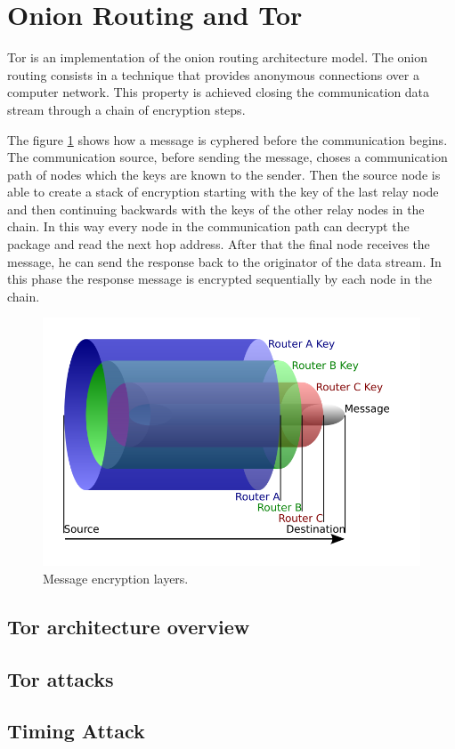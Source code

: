 \section{Onion Routing and Tor}
\label{sec:tor}
Tor is an implementation of the onion routing architecture model. The
onion routing consists in a technique that provides anonymous
connections over a computer network\cite{or}.
This property is achieved closing the communication data stream through a
chain of encryption steps. 

The figure \ref{fig:onion} shows how a
message is cyphered before the communication begins. The communication
source, before sending the message, choses a communication path of nodes
which the keys are known to the sender.
Then the source node is able to create a stack of encryption starting
with the key of the last relay node and then continuing backwards with
the keys of the other relay nodes in the chain. In this way every node
in the communication path can decrypt the package and read the next hop
address. After that the final node receives the message, he can send the
response back to the originator of the data stream. In this phase the response
message is encrypted sequentially by each node in the chain. 
\begin{figure}[H]
	\centering
	\includegraphics[scale=0.35]{onion.png}
	\caption{Message encryption layers.}
	\label{fig:onion}
\end{figure}	

\subsection{Tor architecture overview}
\subsection{Tor attacks}

\subsection{Timing Attack}
